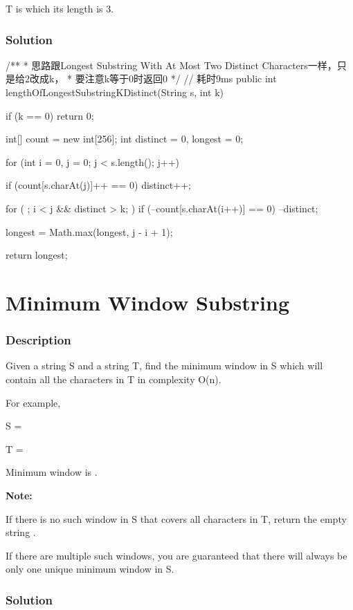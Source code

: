 T is  which its length is 3.

\subsubsection{Solution}

\begin{Code}
/**
 * 思路跟Longest Substring With At Most Two Distinct Characters一样，只是给2改成k，
 * 要注意k等于0时返回0
 */
// 耗时9ms
public int lengthOfLongestSubstringKDistinct(String s, int k) {
    if (k == 0) {
        return 0;
    }

    int[] count = new int[256];
    int distinct = 0, longest = 0;

    for (int i = 0, j = 0; j < s.length(); j++) {
        if (count[s.charAt(j)]++ == 0) {
            distinct++;
        }

        for ( ; i < j && distinct > k; ) {
            if (--count[s.charAt(i++)] == 0) {
                --distinct;
            }
        }

        longest = Math.max(longest, j - i + 1);
    }

    return longest;
}
\end{Code}

\newpage

\section{Minimum Window Substring} %

\subsubsection{Description}
Given a string S and a string T, find the minimum window in S which will contain all the characters in T in complexity O(n).

For example,

S = 

T = 

Minimum window is .

\textbf{Note:}

If there is no such window in S that covers all characters in T, return the empty string .

If there are multiple such windows, you are guaranteed that there will always be only one unique minimum window in S.
\subsubsection{Solution}

